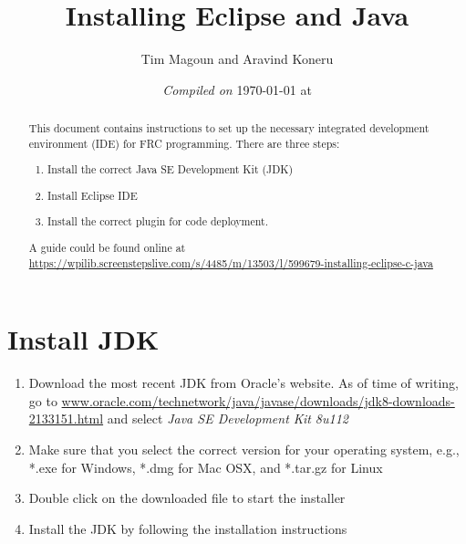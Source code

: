 \documentclass[11pt,fleqn]{article}
\begin{document}
\title{Installing Eclipse and Java}%
\author{Tim Magoun and Aravind Koneru}
\date{\textit{Compiled on} \today \hspace{1mm} at \currenttime}
\maketitle

\begin{abstract}
This document contains instructions to set up the necessary integrated development environment (IDE) for FRC programming. There are three steps:
\begin{enumerate}
\item Install the correct Java SE Development Kit (JDK)
\item Install Eclipse IDE
\item Install the correct plugin for code deployment.
\end{enumerate}
A guide could be found online at \url{https://wpilib.screenstepslive.com/s/4485/m/13503/l/599679-installing-eclipse-c-java}
\end{abstract}

\section*{Install JDK}
\begin{enumerate}
\item Download the most recent JDK from Oracle's website. As of time of writing, go to \url{www.oracle.com/technetwork/java/javase/downloads/jdk8-downloads-2133151.html} and select \emph{Java SE Development Kit 8u112}

\item Make sure that you select the correct version for your operating system, e.g., *.exe for Windows, *.dmg for Mac OSX, and *.tar.gz for Linux

\item Double click on the downloaded file to start the installer

\item Install the JDK by following the installation instructions
\end{enumerate}
\end{document}
